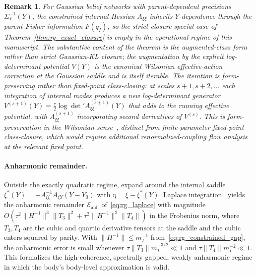 \documentclass[11pt]{article}
\newtheorem{remark}{Remark}
\begin{document}
\begin{remark}
For Gaussian belief networks with parent-dependent precisions $\Sigma_I^{-1}(Y)$, the constrained internal Hessian $A_{\xi\xi}$ inherits $Y$-dependence through the parent Fisher information $F(q_I)$, so the strict-closure special case of Theorem~\ref{thm:rg_exact_closure} is empty in the operational regime of this manuscript. The substantive content of the theorem is the augmented-class form rather than strict Gaussian-KL closure; the augmentation by the explicit log-determinant potential $V(Y)$ is the canonical Wilsonian effective-action correction at the Gaussian saddle and is itself iterable. The iteration is form-preserving rather than fixed-point class-closing: at scales $s+1, s+2, \ldots$ each integration of internal modes produces a new log-determinant generator $V^{(s+1)}(Y) = \tfrac{\tau}{2}\log\det' A_{\xi\xi}^{(s+1)}(Y)$ that adds to the running effective potential, with $A_{\xi\xi}^{(s+1)}$ incorporating second derivatives of $V^{(s)}$. This is form-preservation in the Wilsonian sense~\cite{Wilson1974, Cardy1996}, distinct from finite-parameter fixed-point class-closure, which would require additional renormalized-coupling flow analysis at the relevant fixed point.
\end{remark}

\paragraph{Anharmonic remainder.}
Outside the exactly quadratic regime, expand around the internal saddle $\xi^*(Y) = -A_{\xi\xi}^{-1}A_{\xi Y}(Y - Y_0)$ with $\eta = \xi - \xi^*(Y)$. Laplace integration~\cite{wong2001asymptotic} yields the anharmonic remainder $\mathcal{E}_{\mathrm{anh}}$ of~\eqref{eq:rg_laplace} with magnitude $O(\tau^2 \|H^{-1}\|^3 \|T_3\|^2 + \tau^2 \|H^{-1}\|^2 \|T_4\|)$ in the Frobenius norm, where $T_3, T_4$ are the cubic and quartic derivative tensors at the saddle and the cubic enters squared by parity. With $\|H^{-1}\| \le m_I^{-1}$ from~\eqref{eq:rg_constrained_gap}, the anharmonic error is small whenever $\tau \|T_3\| m_I^{-3/2} \ll 1$ and $\tau \|T_4\| m_I^{-2} \ll 1$. This formalizes the high-coherence, spectrally gapped, weakly anharmonic regime in which the body's body-level approximation is valid.
\end{document}
